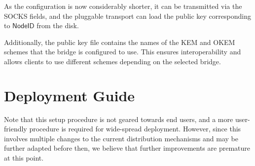 As the configuration is now considerably shorter, it can be transmitted via the SOCKS fields, and the pluggable transport can load the public key corresponding to $\mathsf{NodeID}$ from the disk.

Additionally, the public key file contains the names of the KEM and OKEM schemes that the bridge is configured to use. This ensures interoperability and allows clients to use different schemes depending on the selected bridge.

\section{Deployment Guide} \label{sec:deployment}

Note that this setup procedure is not geared towards end users, and a more user-friendly procedure is required for wide-spread deployment.
However, since this involves multiple changes to the current distribution mechanisms and \drivel{} may be further adapted before then, we believe that further improvements are premature at this point.

